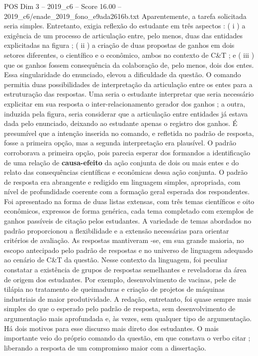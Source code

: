 \begin{textsample}{POS Dim 3 – 2019\_c6 – Score 16.00 – 2019\_c6/enade\_2019\_fono\_e9ada2616b.txt}
Aparentemente, a tarefa solicitada seria simples.
Entretanto, exigia reflexão do estudante em três aspectos : ( i ) a exigência de um processo de articulação entre, pelo menos, duas das entidades explicitadas na figura ; ( ii ) a criação de duas propostas de ganhos em dois setores diferentes, o científico e o econômico, ambos no contexto de C\&T ; e ( iii ) que os ganhos fossem consequência da colaboração de, pelo menos, dois dos entes.
Essa singularidade do enunciado, elevou a dificuldade da questão.
O comando permitia duas possibilidades de interpretação da articulação entre os entes para a estruturação das respostas.
Uma seria o estudante interpretar que seria necessário explicitar em sua resposta o inter-relacionamento gerador dos ganhos ; a outra, induzida pela figura, seria considerar que a articulação entre entidades já estava dada pelo enunciado, deixando ao estudante apenas o registro dos ganhos.
É presumível que a intenção inserida no comando, e refletida no padrão de resposta, fosse a primeira opção, mas a segunda interpretação era plausível.
O padrão corroborava a primeira opção, pois parecia esperar dos formandos a identificação de uma relação de \textbf{causa-efeito} da ação conjunta de dois ou mais entes e do relato das consequências científicas e econômicas dessa ação conjunta.
O padrão de resposta era abrangente e redigido em linguagem simples, apropriada, com nível de profundidade coerente com a formação geral esperada dos respondentes.
Foi apresentado na forma de duas listas extensas, com três temas científicos e oito econômicos, expressos de forma genérica, cada tema completado com exemplos de ganhos passíveis de citação pelos estudantes.
A variedade de temas abordados no padrão proporcionou a flexibilidade e a extensão necessárias para orientar critérios de avaliação.
As respostas mantiveram -se, em sua grande maioria, no escopo antecipado pelo padrão de respostas e no universo de linguagem adequado ao cenário de C\&T da questão.
Nesse contexto da linguagem, foi peculiar constatar a existência de grupos de respostas semelhantes e reveladoras da área de origem dos estudantes.
Por exemplo, desenvolvimento de vacinas, pele de tilápia no tratamento de queimaduras e criação de projetos de máquinas industriais de maior produtividade.
A redação, entretanto, foi quase sempre mais simples do que o esperado pelo padrão de resposta, sem desenvolvimento de argumentação mais aprofundada e, às vezes, sem qualquer tipo de argumentação.
Há dois motivos para esse discurso mais direto dos estudantes.
O mais importante veio do próprio comando da questão, em que constava o verbo citar ; liberando a resposta de um compromisso maior com a dissertação.

\end{textsample}
